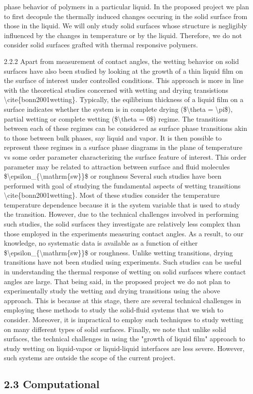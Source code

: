 phase behavior of polymers in a particular liquid. In the proposed project we plan to first decopule the thermally induced changes occuring in the solid surface from those in the liquid. We will only study solid surfaces whose structure is negligibly influenced by the changes in temperature or by the liquid. Therefore, we do not consider solid surfaces grafted with thermal responsive polymers.
\par 2.2.2 Apart from measurement of contact angles, the wetting behavior on solid surfaces have also been studied by looking at the growth of a thin liquid film on the surface of interest under controlled conditions. This approach is more in line with the theoretical studies concerned with wetting and drying transistions \textbackslash cite\{bonn2001wetting\}. Typically, the eqilibrium thickness of a liquid film on a surface indicates whether the system is in complete drying (\$\textbackslash theta = \textbackslash pi\$), partial wetting or complete wetting (\$\textbackslash theta = 0\$) regime. The transitions between each of these regimes can be considered as surface phase transitions akin to those between bulk phases, say liquid and vapor. It is then possible to represent these regimes in a surface phase diagrams in the plane of temperature vs some order parameter characterizing the surface feature of interest. This order parameter may be related to attraction between surface and fluid molecules \$\textbackslash epsilon\_\{\textbackslash mathrm\{sw\}\}\$ or roughness   Several such studies have been performed with goal of studying the fundamental aspects of wetting transitions \textbackslash cite\{bonn2001wetting\}. Most of these studies consider the temperature temperature dependence because it is the system variable that is used to study the transition. However, due to the technical challenges involved in performing such studies, the solid surfaces they investigate are relatively less complex than those employed in the experiments measuring contact angles. As a result, to our knowledge, no systematic data is available as a function of either \$\textbackslash epsilon\_\{\textbackslash mathrm\{sw\}\}\$ or roughness. Unlike wetting transitions, drying transitions have not been studied using experiments. Such studies can be useful in understanding the thermal response of wetting on solid surfaces where contact angles are large. That being said, in the proposed project we do not plan to experimentally study the wetting and drying transitions using the above approach. This is because at this stage, there are several technical challenges in employing these methods to study the solid-fluid systems that we wish to consider. Moreover, it is impractical to employ such techniques to study wetting on many different types of solid surfaces. Finally, we note that unlike solid surfaces, the technical challenges in using the "growth of liquid film" approach  to study wetting on liquid-vapor or liquid-liquid interfaces are less severe. However, such systems are outside the scope of the current project.\subsection{2.3 Computational}

